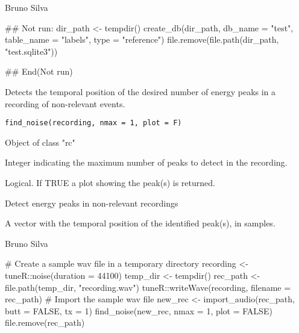 \documentclass[letterpaper]{book}
\begin{document}
%
\begin{Author}\relax
Bruno Silva
\end{Author}
%
\begin{Examples}
\begin{ExampleCode}
## Not run: 
dir_path <- tempdir()
create_db(dir_path, 
db_name = "test", 
table_name = "labels",
type = "reference")
file.remove(file.path(dir_path, "test.sqlite3"))

## End(Not run)
\end{ExampleCode}
\end{Examples}
%
\begin{Description}\relax
Detects the temporal position of the desired number of
energy peaks in a recording of non-relevant events.
\end{Description}
%
\begin{Usage}
\begin{verbatim}
find_noise(recording, nmax = 1, plot = F)
\end{verbatim}
\end{Usage}
%
\begin{Arguments}
\begin{ldescription}
\item[\code{recording}] Object of class "rc"

\item[\code{nmax}] Integer indicating the maximum number of peaks to detect in
the recording.

\item[\code{plot}] Logical. If TRUE a plot showing the peak(s) is returned.
\end{ldescription}
\end{Arguments}
%
\begin{Details}\relax
Detect energy peaks in non-relevant recordings
\end{Details}
%
\begin{Value}
A vector with the temporal position of the
identified peak(s), in samples.
\end{Value}
%
\begin{Author}\relax
Bruno Silva
\end{Author}
%
\begin{Examples}
\begin{ExampleCode}
# Create a sample wav file in a temporary directory
recording <- tuneR::noise(duration = 44100)
temp_dir <- tempdir()
rec_path <- file.path(temp_dir, "recording.wav")
tuneR::writeWave(recording, filename = rec_path)
# Import the sample wav file
new_rec <- import_audio(rec_path, butt = FALSE, tx = 1)
find_noise(new_rec, nmax = 1, plot = FALSE)
file.remove(rec_path)
\end{ExampleCode}
\end{Examples}
\end{document}
